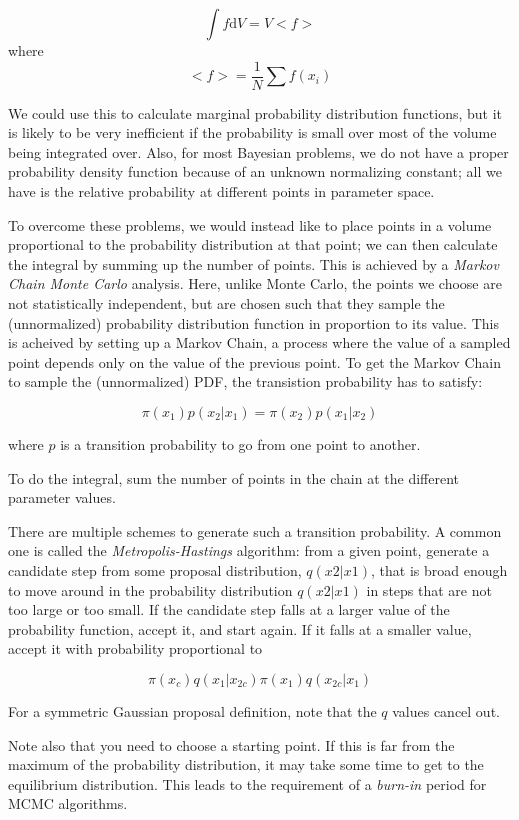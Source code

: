 \documentclass[12pt]{article}
\begin{document}
$$ \int \! f\mathrm{d}V = V<f> $$
where
$$ <f> = \frac{1}{N}\sum f(x_i) $$

We could use this to calculate marginal probability distribution
functions, but it is likely to be very inefficient if the probability
is small over most of the volume being integrated over. Also, for
most Bayesian problems, we do not have a proper probability density
function because of an unknown normalizing constant; all we have is
the relative probability at different points in parameter space.

To overcome these problems, we would instead like to place points
in a volume proportional to the probability distribution at that
point; we can then calculate the integral by summing up the number
of points. This is achieved by a \emph{Markov Chain Monte Carlo}
analysis. Here, unlike Monte Carlo, the points we choose are not
statistically independent, but are chosen such that they sample
the (unnormalized) probability distribution function in proportion
to its value. This is acheived by setting up a Markov Chain,
a process where the value of a sampled point depends only on
the value of the previous point. To get the Markov Chain to sample
the (unnormalized) PDF, the transistion probability has to satisfy:

$$ \pi(x_1)p(x_2|x_1) = \pi(x_2)p(x_1|x_2)  $$

where $p$ is a transition probability to go from one point to another.

To do the integral, sum the number of points in the chain at the
different parameter values.

There are multiple schemes to generate such a transition probability.
A common one is called the \emph{Metropolis-Hastings} algorithm:
from a given point, generate a candidate step from some proposal
distribution, $q(x2|x1)$, that is broad enough to move around in the
probability distribution $q(x2|x1)$ in steps that are not too large
or too small. If the candidate step falls at a larger value of the
probability function, accept it, and start again. If it falls at a
smaller value, accept it with probability proportional to

$$ \pi(x_c)q(x_1|x_{2c}) \pi(x_1)q(x_{2c}|x_1)  $$

For a symmetric Gaussian proposal definition, note that the $q$ values
cancel out.

Note also that you need to choose a starting point. If this is far from
the maximum of the probability distribution, it may take some time to
get to the equilibrium distribution. This leads to the requirement of a
\emph{burn-in} period for MCMC algorithms.
\end{document}
